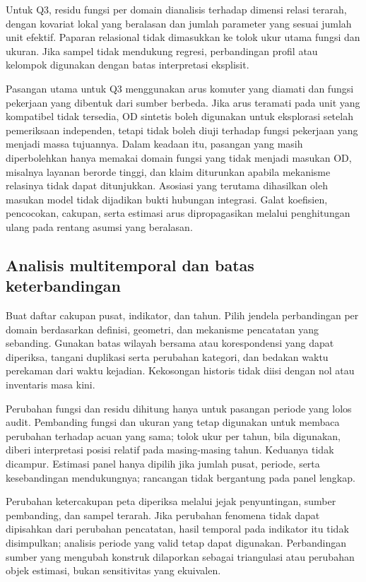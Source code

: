 \documentclass[11pt,a4paper,oneside,openany,indonesian]{report}
\begin{document}
Untuk Q3, residu fungsi per domain dianalisis terhadap dimensi relasi
terarah, dengan kovariat lokal yang beralasan dan jumlah parameter yang
sesuai jumlah unit efektif. Paparan relasional tidak dimasukkan ke tolok
ukur utama fungsi dan ukuran. Jika sampel tidak mendukung regresi,
perbandingan profil atau kelompok digunakan dengan batas interpretasi
eksplisit.

Pasangan utama untuk Q3 menggunakan arus komuter yang diamati dan fungsi
pekerjaan yang dibentuk dari sumber berbeda. Jika arus teramati pada unit
yang kompatibel tidak tersedia, OD sintetis boleh digunakan untuk
eksplorasi setelah pemeriksaan independen, tetapi tidak boleh diuji
terhadap fungsi pekerjaan yang menjadi massa tujuannya. Dalam keadaan
itu, pasangan yang masih diperbolehkan hanya memakai domain fungsi yang
tidak menjadi masukan OD, misalnya layanan berorde tinggi, dan klaim
diturunkan apabila mekanisme relasinya tidak dapat ditunjukkan. Asosiasi
yang terutama dihasilkan oleh masukan model tidak dijadikan bukti
hubungan integrasi. Galat koefisien, pencocokan, cakupan, serta estimasi
arus dipropagasikan melalui penghitungan ulang pada rentang asumsi yang
beralasan.

\subsection{Analisis multitemporal dan batas
keterbandingan}\label{analisis-multitemporal-dan-batas-keterbandingan}

Buat daftar cakupan pusat, indikator, dan tahun. Pilih jendela perbandingan
per domain berdasarkan definisi, geometri, dan mekanisme pencatatan yang
sebanding. Gunakan batas wilayah bersama atau korespondensi yang dapat
diperiksa, tangani duplikasi serta perubahan kategori, dan bedakan waktu
perekaman dari waktu kejadian. Kekosongan historis tidak diisi dengan
nol atau inventaris masa kini.

Perubahan fungsi dan residu dihitung hanya untuk pasangan periode yang
lolos audit. Pembanding fungsi dan ukuran yang tetap digunakan untuk
membaca perubahan terhadap acuan yang sama; tolok ukur per tahun, bila
digunakan, diberi interpretasi posisi relatif pada masing-masing tahun.
Keduanya tidak dicampur. Estimasi panel hanya dipilih jika jumlah pusat,
periode, serta kesebandingan mendukungnya; rancangan tidak bergantung
pada panel lengkap.

Perubahan ketercakupan peta diperiksa melalui jejak penyuntingan, sumber
pembanding, dan sampel terarah. Jika perubahan fenomena tidak dapat
dipisahkan dari perubahan pencatatan, hasil temporal pada indikator itu
tidak disimpulkan; analisis periode yang valid tetap dapat digunakan.
Perbandingan sumber yang mengubah konstruk dilaporkan sebagai
triangulasi atau perubahan objek estimasi, bukan sensitivitas yang
ekuivalen.
\end{document}
